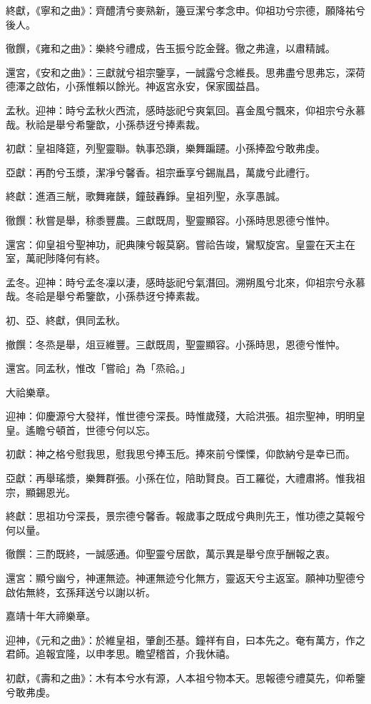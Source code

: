 終獻，《寧和之曲》：齊醴清兮麥熟新，籩豆潔兮孝念申。仰祖功兮宗德，願降祐兮後人。

徹饌，《雍和之曲》：樂終兮禮成，告玉振兮訖金聲。徹之弗違，以肅精誠。

還宮，《安和之曲》：三獻就兮祖宗鑒享，一誠露兮念維長。思弗盡兮思弗忘，深荷德澤之啟佑，小孫惟賴以餘光。神返宮永安，保家國益昌。

孟秋。迎神：時兮孟秋火西流，感時毖祀兮爽氣回。喜金風兮飄來，仰祖宗兮永慕哉。秋祫是舉兮希鑒歆，小孫恭迓兮捧素裁。

初獻：皇祖降筵，列聖靈聯。執事恐蹎，樂舞蹁躚。小孫捧盈兮敢弗虔。

亞獻：再酌兮玉漿，潔凈兮馨香。祖宗垂享兮錫胤昌，萬歲兮此禮行。

終獻：進酒三觥，歌舞雍韺，鐘鼓轟錚。皇祖列聖，永享愚誠。

徹饌：秋嘗是舉，稌黍豐農。三獻既周，聖靈顯容。小孫時思恩德兮惟忡。

還宮：仰皇祖兮聖神功，祀典陳兮報莫窮。嘗祫告竣，鸞馭旋宮。皇靈在天主在室，萬祀陟降何有終。

孟冬。迎神：時兮孟冬凜以淒，感時毖祀兮氣潛回。溯朔風兮北來，仰祖宗兮永慕哉。冬祫是舉兮希鑒歆，小孫恭迓兮捧素裁。

初、亞、終獻，俱同孟秋。

撤饌：冬烝是舉，俎豆維豐。三獻既周，聖靈顯容。小孫時思，恩德兮惟忡。

還宮。同孟秋，惟改「嘗祫」為「烝祫。」

大祫樂章。

迎神：仰慶源兮大發祥，惟世德兮深長。時惟歲殘，大祫洪張。祖宗聖神，明明皇皇。遙瞻兮頓首，世德兮何以忘。

初獻：神之格兮慰我思，慰我思兮捧玉卮。捧來前兮慄慄，仰歆納兮是幸已而。

亞獻：再舉瑤漿，樂舞群張。小孫在位，陪助賢良。百工羅從，大禮肅將。惟我祖宗，顯錫恩光。

終獻：思祖功兮深長，景宗德兮馨香。報歲事之既成兮典則先王，惟功德之莫報兮何以量。

徹饌：三酌既終，一誠感通。仰聖靈兮居歆，萬示異是舉兮庶乎酬報之衷。

還宮：顯兮幽兮，神運無迹。神運無迹兮化無方，靈返天兮主返室。願神功聖德兮啟佑無終，玄孫拜送兮以謝以祈。

嘉靖十年大禘樂章。

迎神，《元和之曲》：於維皇祖，肇創丕基。鐘祥有自，曰本先之。奄有萬方，作之君師。追報宜隆，以申孝思。瞻望稽首，介我休禧。

初獻，《壽和之曲》：木有本兮水有源，人本祖兮物本天。思報德兮禮莫先，仰希鑒兮敢弗虔。

